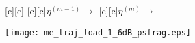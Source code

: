 \documentclass{article}
\begin{document}
\begin{figure}[htb]
  \begin{center}

        [c][c]{}
        [c][c]{$\eta^{(m-1)}\rightarrow$}
        [c][c]{$\eta^{(m)} \rightarrow$}


    \texttt{[image: me\_traj\_load\_1\_6dB\_psfrag.eps]}
    \end{center}
\end{figure}
\end{document}

